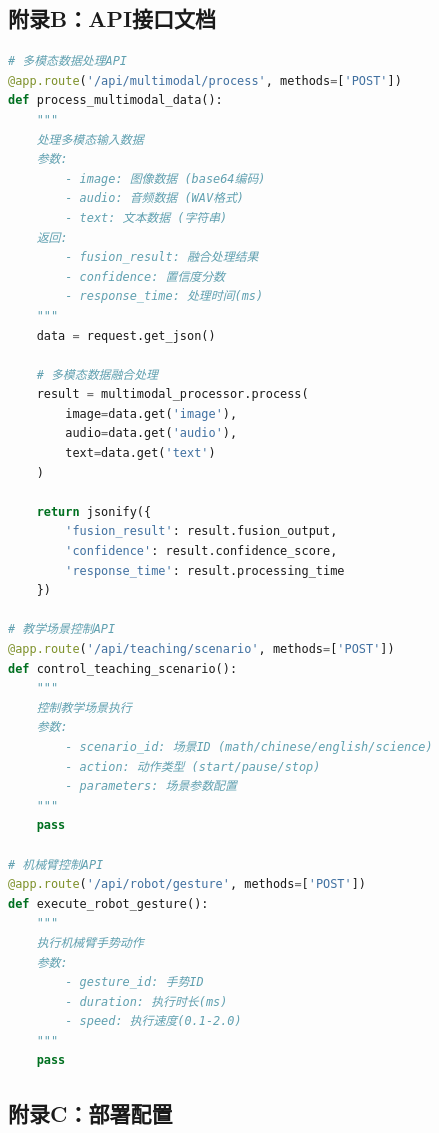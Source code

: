 \documentclass[12pt,a4paper]{article}
\begin{document}
\subsection*{附录B：API接口文档}

\begin{lstlisting}[language=Python, caption=核心API接口示例]
# 多模态数据处理API
@app.route('/api/multimodal/process', methods=['POST'])
def process_multimodal_data():
    """
    处理多模态输入数据
    参数:
        - image: 图像数据 (base64编码)
        - audio: 音频数据 (WAV格式)
        - text: 文本数据 (字符串)
    返回:
        - fusion_result: 融合处理结果
        - confidence: 置信度分数
        - response_time: 处理时间(ms)
    """
    data = request.get_json()
    
    # 多模态数据融合处理
    result = multimodal_processor.process(
        image=data.get('image'),
        audio=data.get('audio'),
        text=data.get('text')
    )
    
    return jsonify({
        'fusion_result': result.fusion_output,
        'confidence': result.confidence_score,
        'response_time': result.processing_time
    })

# 教学场景控制API
@app.route('/api/teaching/scenario', methods=['POST'])
def control_teaching_scenario():
    """
    控制教学场景执行
    参数:
        - scenario_id: 场景ID (math/chinese/english/science)
        - action: 动作类型 (start/pause/stop)
        - parameters: 场景参数配置
    """
    pass

# 机械臂控制API
@app.route('/api/robot/gesture', methods=['POST'])
def execute_robot_gesture():
    """
    执行机械臂手势动作
    参数:
        - gesture_id: 手势ID
        - duration: 执行时长(ms)
        - speed: 执行速度(0.1-2.0)
    """
    pass
\end{lstlisting}

\subsection*{附录C：部署配置}
\end{document}
